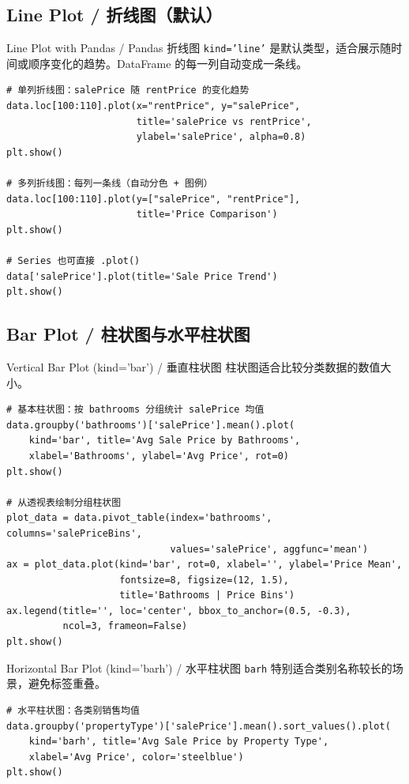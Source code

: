 \documentclass[11pt,a4paper]{report}
\let\oldtexttt\texttt
\renewcommand{\texttt}[1]{\textcolor{mainblue}{\oldtexttt{#1}}}
\begin{document}
\subsection{Line Plot / 折线图（默认）}

\begin{examplebox}{Line Plot with Pandas / Pandas 折线图}
    \texttt{kind='line'} 是默认类型，适合展示随时间或顺序变化的趋势。DataFrame 的每一列自动变成一条线。
\begin{lstlisting}
# 单列折线图：salePrice 随 rentPrice 的变化趋势
data.loc[100:110].plot(x="rentPrice", y="salePrice",
                       title='salePrice vs rentPrice',
                       ylabel='salePrice', alpha=0.8)
plt.show()

# 多列折线图：每列一条线（自动分色 + 图例）
data.loc[100:110].plot(y=["salePrice", "rentPrice"],
                       title='Price Comparison')
plt.show()

# Series 也可直接 .plot()
data['salePrice'].plot(title='Sale Price Trend')
plt.show()
\end{lstlisting}
\end{examplebox}

\subsection{Bar Plot / 柱状图与水平柱状图}

\begin{examplebox}{Vertical Bar Plot (kind='bar') / 垂直柱状图}
    柱状图适合比较分类数据的数值大小。
\begin{lstlisting}
# 基本柱状图：按 bathrooms 分组统计 salePrice 均值
data.groupby('bathrooms')['salePrice'].mean().plot(
    kind='bar', title='Avg Sale Price by Bathrooms',
    xlabel='Bathrooms', ylabel='Avg Price', rot=0)
plt.show()

# 从透视表绘制分组柱状图
plot_data = data.pivot_table(index='bathrooms', columns='salePriceBins',
                             values='salePrice', aggfunc='mean')
ax = plot_data.plot(kind='bar', rot=0, xlabel='', ylabel='Price Mean',
                    fontsize=8, figsize=(12, 1.5),
                    title='Bathrooms | Price Bins')
ax.legend(title='', loc='center', bbox_to_anchor=(0.5, -0.3),
          ncol=3, frameon=False)
plt.show()
\end{lstlisting}
\end{examplebox}

\begin{examplebox}{Horizontal Bar Plot (kind='barh') / 水平柱状图}
    \texttt{barh} 特别适合类别名称较长的场景，避免标签重叠。
\begin{lstlisting}
# 水平柱状图：各类别销售均值
data.groupby('propertyType')['salePrice'].mean().sort_values().plot(
    kind='barh', title='Avg Sale Price by Property Type',
    xlabel='Avg Price', color='steelblue')
plt.show()
\end{lstlisting}
\end{examplebox}
\end{document}
